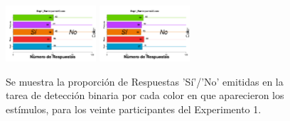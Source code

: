 \documentclass[a4paper ]{article}
\begin{document}
\begin{figure}[th]
\includegraphics[width=0.3\textwidth]{Figures/BiasColor_Exp1_P19} \includegraphics[width=0.3\textwidth]{Figures/BiasColor_Exp1_P20} 
\caption[Proporción de Respuestas Sí/No por Color; Experimento 1]{Se muestra la proporción de Respuestas 'Sí'/'No' emitidas en la tarea de detección binaria por cada color en que aparecieron los estímulos, para los veinte participantes del Experimento 1.}
\label{fig:BiasCol_E1}
\end{figure}
\end{document}
